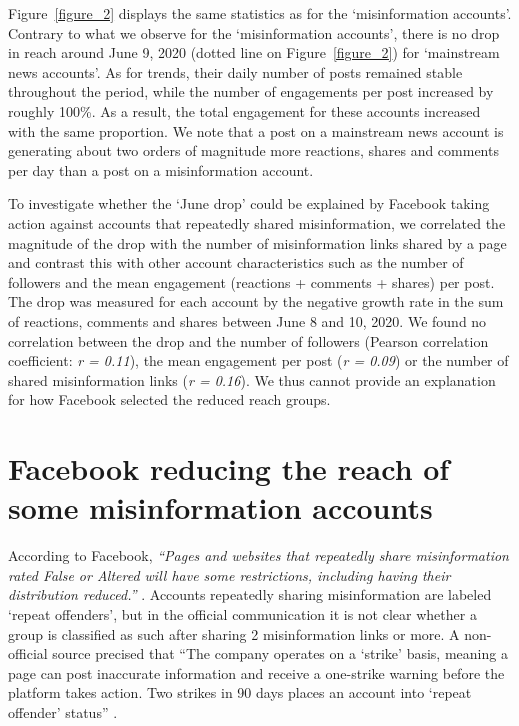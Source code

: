 \documentclass[sigconf]{acmart}
\begin{document}
Figure~\ref{figure_2} displays the same statistics as for the `misinformation accounts'. Contrary to what we observe for the `misinformation accounts', there is no drop in reach around June 9, 2020 (dotted line on Figure~\ref{figure_2}) for `mainstream news accounts'. As for trends, their daily number of posts remained stable throughout the period, while the number of  engagements per post increased by roughly 100\%. As a result, the total engagement for these accounts increased with the same proportion. We note that a post on a mainstream news account is generating about two orders of magnitude more reactions, shares and comments per day than a post on a misinformation account.

To investigate whether the `June drop' could be explained by Facebook taking action against accounts that repeatedly shared misinformation, we correlated the magnitude of the drop with the number of misinformation links shared by a page and contrast this with other account characteristics such as the number of followers and the mean engagement (reactions + comments + shares) per post. The drop was measured for each account by the negative growth rate in the sum of reactions, comments and shares between June 8 and 10, 2020. We found no correlation between the drop and the number of followers (Pearson correlation coefficient: \textit{r = 0.11}), the mean engagement per post (\textit{r = 0.09}) or the number of shared misinformation links (\textit{r = 0.16}). We thus cannot provide an explanation for how  Facebook selected the reduced reach groups.

\section{Facebook reducing the reach of some misinformation accounts}

According to Facebook, \textit{``Pages and websites that repeatedly share misinformation rated False or Altered will have some restrictions, including having their distribution reduced.''} \cite{FacebookMeasuresAgainstMisinformation}. Accounts repeatedly sharing misinformation are labeled `repeat offenders', but in the official communication it is not clear whether a group is classified as such after sharing 2 misinformation links or more. A non-official source precised that ``The company operates on a `strike' basis, meaning a page can post inaccurate information and receive a one-strike warning before the platform takes action. Two strikes in 90 days places an account into `repeat offender' status'' \cite{NBCnewsMeasuresAgainstMisinformation}.
\end{document}
